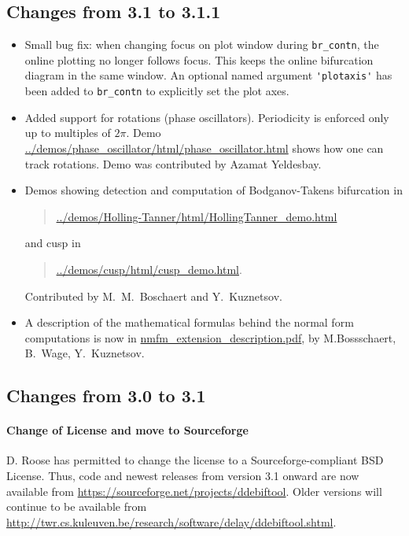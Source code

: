 \documentclass[10pt]{scrartcl}
\newcommand{\ddebifweb}{\url{https://sourceforge.net/projects/ddebiftool}}
\newcommand{\ddebifwebold}{\url{http://twr.cs.kuleuven.be/research/software/delay/ddebiftool.shtml}}
\newcommand{\blist}[1]{\mbox{\lstinline!#1!}}
\begin{document}
\subsection{Changes from 3.1 to 3.1.1}
\label{sec:v31to311}
\begin{itemize}
\item Small bug fix: when changing focus on plot window during
  \blist{br_contn}, the online plotting no longer follows focus. This
  keeps the online bifurcation diagram in the same window. An optional
  named argument \blist{'plotaxis'} has been added to \blist{br_contn}
  to explicitly set the plot axes.
\item Added support for rotations (phase oscillators). Periodicity is
  enforced only up to multiples of $2\pi$. Demo
  \url{../demos/phase_oscillator/html/phase_oscillator.html} shows
  how one can track rotations. Demo was contributed by Azamat Yeldesbay.
\item Demos showing detection and computation of Bodganov-Takens
  bifurcation in
  \begin{quote}
    \url{../demos/Holling-Tanner/html/HollingTanner_demo.html}
  \end{quote}
  and cusp in
  \begin{quote}
    \url{../demos/cusp/html/cusp_demo.html}.
  \end{quote}
  Contributed by M.~M.~Boschaert and Y.~Kuznetsov.
\item A description of
  the mathematical formulas behind the normal form computations is now
  in \url{nmfm_extension_description.pdf}, by M.Bossschaert, B.~Wage,
  Y.~Kuznetsov.
\end{itemize}
\subsection{Changes from 3.0 to 3.1}
\label{sec:v3to31}
\paragraph{Change of License and move to Sourceforge}
D. Roose has permitted to change the license to a
Sourceforge-compliant BSD License. Thus, code and newest releases from
version 3.1 onward are now available from \ddebifweb{}. Older versions
will continue to be available from \ddebifwebold{}.
\end{document}

